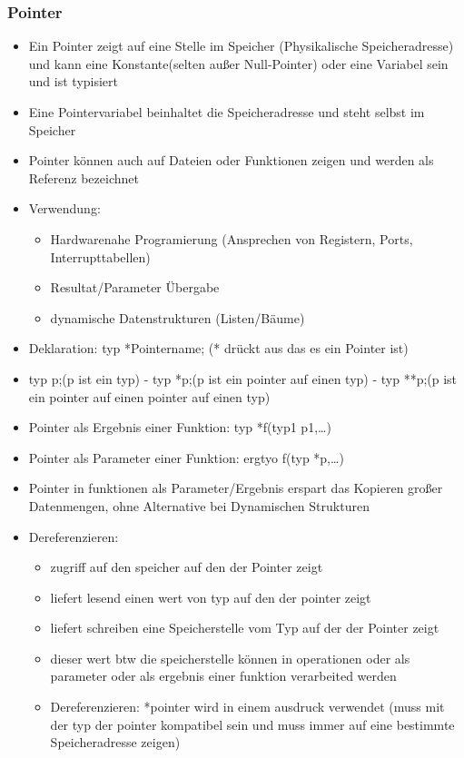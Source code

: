 \documentclass[10pt,a5paper]{article}
\begin{document}
\subsubsection{Pointer}
\begin{itemize}
\item Ein Pointer zeigt auf eine Stelle im Speicher (Physikalische Speicheradresse) und kann eine Konstante(selten außer Null-Pointer) oder eine Variabel sein und ist typisiert
\item Eine Pointervariabel beinhaltet die Speicheradresse und steht selbst im Speicher
\item Pointer können auch auf Dateien oder Funktionen zeigen und werden als Referenz bezeichnet
\item Verwendung:\begin{itemize}
\item Hardwarenahe Programierung (Ansprechen von Registern, Ports, Interrupttabellen)
\item Resultat/Parameter Übergabe
\item dynamische Datenstrukturen (Listen/Bäume)
\end{itemize}
\item Deklaration: typ *Pointername; (* drückt aus das es ein Pointer ist)
\item typ p;(p ist ein typ) - typ *p;(p ist ein pointer auf einen typ) - typ **p;(p ist ein pointer auf einen pointer auf einen typ)
\item Pointer als Ergebnis einer Funktion: typ *f(typ1 p1,\dots)
\item Pointer als Parameter einer Funktion: ergtyo f(typ *p,\dots)
\item Pointer in funktionen als Parameter/Ergebnis erspart das Kopieren großer Datenmengen, ohne Alternative bei Dynamischen Strukturen
\item Dereferenzieren:\begin{itemize}
\item zugriff auf den speicher auf den der Pointer zeigt
\item liefert lesend einen wert von typ auf den der pointer zeigt
\item liefert schreiben eine Speicherstelle vom Typ auf der der Pointer zeigt
\item dieser wert btw die speicherstelle können in operationen oder als parameter oder als ergebnis einer funktion verarbeited werden
\item Dereferenzieren: *pointer wird in einem ausdruck verwendet (muss mit der typ der pointer kompatibel sein und muss immer auf eine bestimmte Speicheradresse zeigen)

\end{itemize}
\end{itemize}
\end{document}
